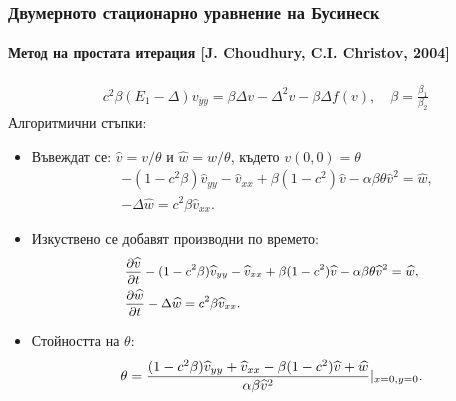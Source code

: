 \documentclass{beamer}
\newcommand{\rf}[1]{(\ref{#1})}
\begin{document}

\begin{frame}
\frametitle{Двумерното стационарно уравнение на Бусинеск}
\framesubtitle{Метод на простата итерация [J. Choudhury, C.I. Christov, 2004]} 
 \begin{align}\label{eq3}
&c^2 \beta (E_1- \Delta) v_{{\overline y}{\overline y}} = \beta \Delta v - \Delta^2 v - \beta \Delta f(v), \quad \beta = \frac{\beta_1}{\beta_2}
\end{align}
Алгоритмични стъпки:
\begin{itemize} %
  \item Въвеждат се: $\widehat{v}=v/{\theta} $ и $\widehat{w}=w/{\theta} $, където $v(0,0)=\theta$
\begin{align}\label{eq45}
 &- (1 - c^2 \beta) \widehat{v}_{yy} -\widehat{v}_{xx} + \beta (1-c^2) \widehat{v} - \alpha \beta \theta \widehat{v}^2 = \widehat{w}, \\
 &- \Delta \widehat{w} =  c^2 \beta \widehat{v}_{xx}.
\end{align}
  \item Изкуствено се добавят производни по времето:
\begin{align}\label{eq5}
\small
\begin{split}
 &\frac {\partial \widehat{v}}{\partial t} - (1 - c^2 \beta) \widehat{v}_{yy} -\widehat{v}_{xx} + \beta (1-c^2) \widehat{v} - \alpha \beta \theta \widehat{v}^2 = \widehat{w}, \\
 &\frac {\partial \widehat{w}}{\partial t} - \Delta \widehat{w} =  c^2 \beta \widehat{v}_{xx}. 
\end{split}
\end{align}
\item Стойността на $\theta$:
\begin{equation}\label{eqtheta}
\small
\theta = \frac{ (1-c^2 \beta) \widehat{v}_{yy} + \widehat{v}_{xx} - \beta (1-c^2) \widehat{v} +\widehat{w}}{\alpha \beta \widehat{v}^2 } |_{x=0,y=0}.
\end{equation}
\end{itemize}



\end{frame}
\end{document}
